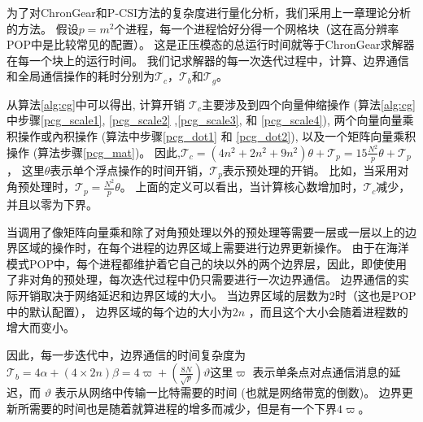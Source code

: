 为了对ChronGear和P-CSI方法的复杂度进行量化分析，我们采用上一章理论分析的方法。
假设$p=m^2$个进程，每一个进程恰好分得一个网格块（这在高分辨率POP中是比较常见的配置）。 
这是正压模态的总运行时间就等于ChronGear求解器在每一个块上的运行时间。 
我们记求解器的每一次迭代过程中，计算、边界通信和全局通信操作的耗时分别为$\mathcal{T}_c$，$\mathcal{T}_b$和$\mathcal{T}_g$。 


从算法\ref{alg:cg}中可以得出, 计算开销
$\mathcal{T}_c$主要涉及到四个向量伸缩操作 (算法\ref{alg:cg}中步骤\ref{pcg_scale1}, \ref{pcg_scale2} ,\ref{pcg_scale3}, 和
\ref{pcg_scale4}), 两个向量向量乘积操作或內积操作 (算法中步骤\ref{pcg_dot1} 和 \ref{pcg_dot2}), 以及一个矩阵向量乘积操作 (算法步骤\ref{pcg_mat})。
因此,$\mathcal{T}_c= (4 n^2 +2n^2+ 9n^2)\theta + \mathcal{T}_{p}=15\frac{N^2}{p}\theta+\mathcal{T}_{p}$，
这里$\theta$表示单个浮点操作的时间开销，$\mathcal{T}_{p}$表示预处理的开销。
比如，当采用对角预处理时，$\mathcal{T}_{p} =\frac{N^2}{p}\theta$。
上面的定义可以看出，当计算核心数增加时，$\mathcal{T}_c$减少，并且以零为下界。

 
当调用了像矩阵向量乘和除了对角预处理以外的预处理等需要一层或一层以上的边界区域的操作时，在每个进程的边界区域上需要进行边界更新操作。 
由于在海洋模式POP中，每个进程都维护着它自己的块以外的两个边界层，因此，即使使用了非对角的预处理，每次迭代过程中仍只需要进行一次边界通信。
边界通信的实际开销取决于网络延迟和边界区域的大小。 当边界区域的层数为2时（这也是POP中的默认配置）， 边界区域的每个边的大小为$2n$ ，而且这个大小会随着进程数的增大而变小。 
 
因此，每一步迭代中，边界通信的时间复杂度为$\mathcal{T}_b =4\alpha +(4\times 2n)\beta=4\varpi +(\frac{8N}{\sqrt{p}})\vartheta $这里$\varpi$ 表示单条点对点通信消息的延迟，而
$\vartheta$ 表示从网络中传输一比特需要的时间 (也就是网络带宽的倒数)。
边界更新所需要的时间也是随着就算进程的增多而减少，但是有一个下界$4\varpi$。 


